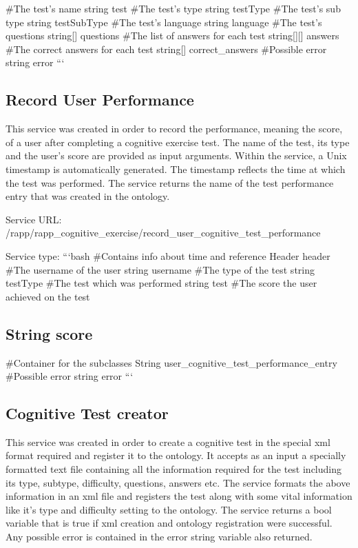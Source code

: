 \#\-The test’s name string test \#\-The test’s type string test\-Type \#\-The test’s sub type string test\-Sub\-Type \#\-The test’s language string language \#\-The test’s questions string\mbox{[}\mbox{]} questions \#\-The list of answers for each test string\mbox{[}\mbox{]}\mbox{[}\mbox{]} answers \#\-The correct answers for each test string\mbox{[}\mbox{]} correct\-\_\-answers \#\-Possible error string error ```

\subsection*{Record User Performance}

This service was created in order to record the performance, meaning the score, of a user after completing a cognitive exercise test. The name of the test, its type and the user’s score are provided as input arguments. Within the service, a Unix timestamp is automatically generated. The timestamp reflects the time at which the test was performed. The service returns the name of the test performance entry that was created in the ontology.

Service U\-R\-L\-: {\ttfamily /rapp/rapp\-\_\-cognitive\-\_\-exercise/record\-\_\-user\-\_\-cognitive\-\_\-test\-\_\-performance}

Service type\-: ```bash \#\-Contains info about time and reference Header header \#\-The username of the user string username \#\-The type of the test string test\-Type \#\-The test which was performed string test \#\-The score the user achieved on the test \subsection*{String score }

\#\-Container for the subclasses String user\-\_\-cognitive\-\_\-test\-\_\-performance\-\_\-entry \#\-Possible error string error ```

\subsection*{Cognitive Test creator}

This service was created in order to create a cognitive test in the special xml format required and register it to the ontology. It accepts as an input a specially formatted text file containing all the information required for the test including its type, subtype, difficulty, questions, answers etc. The service formats the above information in an xml file and registers the test along with some vital information like it’s type and difficulty setting to the ontology. The service returns a bool variable that is true if xml creation and ontology registration were successful. Any possible error is contained in the error string variable also returned.

